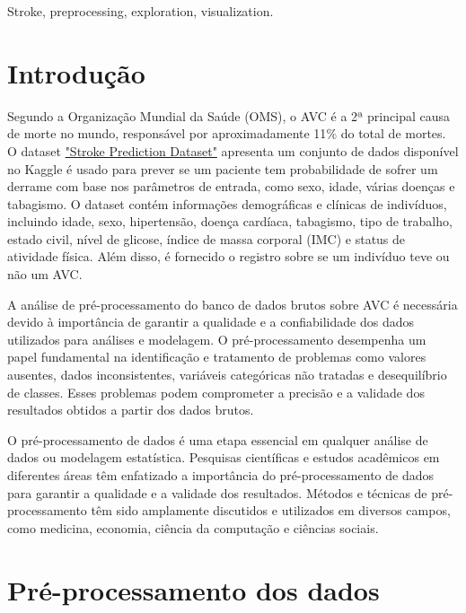 \documentclass[conference]{IEEEtran}
\begin{document}
\begin{IEEEkeywords}
Stroke, preprocessing, exploration, visualization.
\end{IEEEkeywords}

\section{Introdução}
\label{AA}
Segundo a Organização Mundial da Saúde (OMS), o AVC é a 2ª principal causa de morte no mundo, responsável por aproximadamente 11$\%$ do total de mortes. O dataset \href{https://www.kaggle.com/datasets/fedesoriano/stroke-prediction-dataset}{"Stroke Prediction Dataset"} apresenta um conjunto de dados disponível no Kaggle é usado para prever se um paciente tem probabilidade de sofrer um derrame com base nos parâmetros de entrada, como sexo, idade, várias doenças e tabagismo. O dataset contém informações demográficas e clínicas de indivíduos, incluindo idade, sexo, hipertensão, doença cardíaca, tabagismo, tipo de trabalho, estado civil, nível de glicose, índice de massa corporal (IMC) e status de atividade física. Além disso, é fornecido o registro sobre se um indivíduo teve ou não um AVC.

A análise de pré-processamento do banco de dados brutos sobre AVC é necessária devido à importância de garantir a qualidade e a confiabilidade dos dados utilizados para análises e modelagem. O pré-processamento desempenha um papel fundamental na identificação e tratamento de problemas como valores ausentes, dados inconsistentes, variáveis categóricas não tratadas e desequilíbrio de classes. Esses problemas podem comprometer a precisão e a validade dos resultados obtidos a partir dos dados brutos.

O pré-processamento de dados é uma etapa essencial em qualquer análise de dados ou modelagem estatística. Pesquisas científicas e estudos acadêmicos em diferentes áreas têm enfatizado a importância do pré-processamento de dados para garantir a qualidade e a validade dos resultados. Métodos e técnicas de pré-processamento têm sido amplamente discutidos e utilizados em diversos campos, como medicina, economia, ciência da computação e ciências sociais.


\section{Pré-processamento dos dados}
\end{document}

